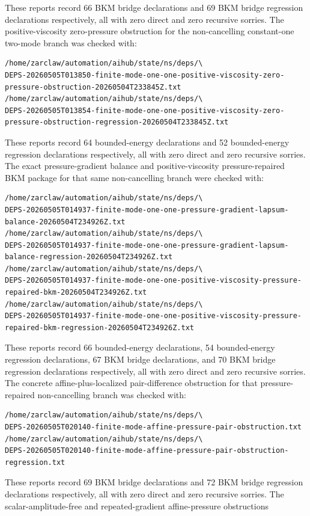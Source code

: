 \documentclass[11pt]{article}
\begin{document}
These reports record 66 BKM bridge declarations and 69 BKM bridge regression
declarations respectively, all with zero direct and zero recursive sorries.
The positive-viscosity zero-pressure obstruction for the non-cancelling
constant-one two-mode branch was checked with:
\begin{verbatim}
/home/zarclaw/automation/aihub/state/ns/deps/\
DEPS-20260505T013850-finite-mode-one-one-positive-viscosity-zero-pressure-obstruction-20260504T233845Z.txt
/home/zarclaw/automation/aihub/state/ns/deps/\
DEPS-20260505T013854-finite-mode-one-one-positive-viscosity-zero-pressure-obstruction-regression-20260504T233845Z.txt
\end{verbatim}
These reports record 64 bounded-energy declarations and 52 bounded-energy
regression declarations respectively, all with zero direct and zero recursive
sorries.
The exact pressure-gradient balance and positive-viscosity pressure-repaired
BKM package for that same non-cancelling branch were checked with:
\begin{verbatim}
/home/zarclaw/automation/aihub/state/ns/deps/\
DEPS-20260505T014937-finite-mode-one-one-pressure-gradient-lapsum-balance-20260504T234926Z.txt
/home/zarclaw/automation/aihub/state/ns/deps/\
DEPS-20260505T014937-finite-mode-one-one-pressure-gradient-lapsum-balance-regression-20260504T234926Z.txt
/home/zarclaw/automation/aihub/state/ns/deps/\
DEPS-20260505T014937-finite-mode-one-one-positive-viscosity-pressure-repaired-bkm-20260504T234926Z.txt
/home/zarclaw/automation/aihub/state/ns/deps/\
DEPS-20260505T014937-finite-mode-one-one-positive-viscosity-pressure-repaired-bkm-regression-20260504T234926Z.txt
\end{verbatim}
These reports record 66 bounded-energy declarations, 54 bounded-energy
regression declarations, 67 BKM bridge declarations, and 70 BKM bridge
regression declarations respectively, all with zero direct and zero recursive
sorries.
The concrete affine-plus-localized pair-difference obstruction for that
pressure-repaired non-cancelling branch was checked with:
\begin{verbatim}
/home/zarclaw/automation/aihub/state/ns/deps/\
DEPS-20260505T020140-finite-mode-affine-pressure-pair-obstruction.txt
/home/zarclaw/automation/aihub/state/ns/deps/\
DEPS-20260505T020140-finite-mode-affine-pressure-pair-obstruction-regression.txt
\end{verbatim}
These reports record 69 BKM bridge declarations and 72 BKM bridge regression
declarations respectively, all with zero direct and zero recursive sorries.
The scalar-amplitude-free and repeated-gradient affine-pressure obstructions
\end{document}
